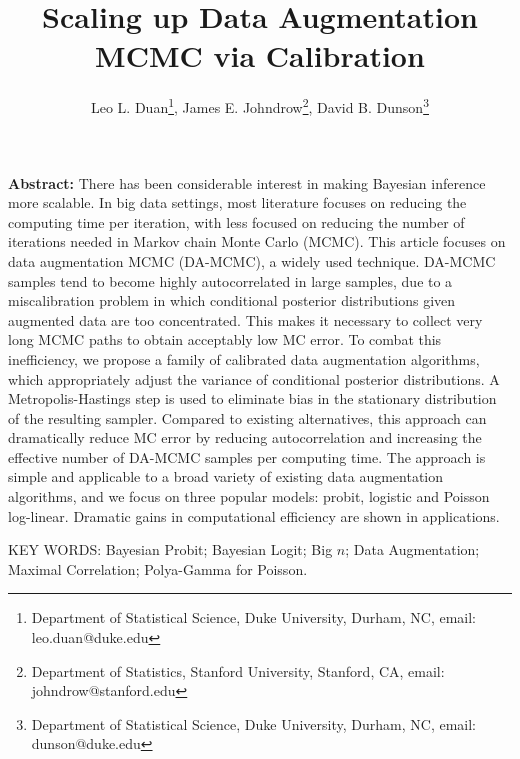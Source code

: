 \documentclass[11pt]{article}
\begin{document}
\title{{Scaling up Data Augmentation MCMC via Calibration}}



\author{ Leo L. Duan\thanks{Department of Statistical Science, Duke University, Durham, NC, email: leo.duan@duke.edu},
     James E. Johndrow\thanks{Department of Statistics, Stanford University, Stanford, CA, email: johndrow@stanford.edu},
     David B. Dunson\thanks{Department of Statistical Science, Duke University, Durham, NC, email: dunson@duke.edu}
     }

\editor{}
\maketitle


{\bf Abstract:} 
{There has been considerable interest in making Bayesian inference more scalable.}
{In big data settings},  most literature focuses on reducing the computing
time per iteration, with less focused on reducing the number of iterations
needed in Markov chain Monte Carlo (MCMC). This article focuses on data
augmentation MCMC (DA-MCMC), a widely used technique. {DA-MCMC samples tend
to become highly autocorrelated in large samples, due to a miscalibration problem in which conditional posterior distributions given augmented data are too concentrated.  This makes it necessary to collect very long MCMC
paths to obtain acceptably low MC error.} {To combat this inefficiency, we propose a family of calibrated data augmentation algorithms, which appropriately adjust the variance of conditional posterior distributions. A Metropolis-Hastings step is used to eliminate bias in the stationary distribution of the resulting sampler}. {Compared to existing alternatives, this approach} {can dramatically reduce MC error by reducing autocorrelation and increasing the effective number of DA-MCMC samples per computing time.} The approach is {simple and}  applicable to a broad variety of existing data augmentation algorithms, and we focus on three popular models: probit, logistic and Poisson log-linear.  Dramatic gains in computational efficiency are shown in applications.
\vskip 12pt 

{\noindent  KEY WORDS:   Bayesian Probit; Bayesian Logit; Big $n$; Data Augmentation; Maximal Correlation; Polya-Gamma for Poisson.}

\vfill
\end{document}
